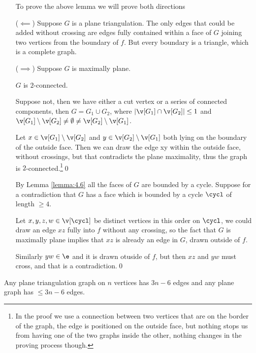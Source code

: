 \begin{prf}
    \begin{itemize}
        To prove the above lemma we will prove both directions
        \item [($\impliedby$)] Suppose $G$ is a plane triangulation. The only edges that could be added without crossing are edges fully contained within a face of $G$ joining two vertices from the boundary of $f$. But every boundary is a triangle, which is a complete graph.
        \item [($\implies$)] Suppose $G$ is maximally plane.
        \begin{customclaim}{1}
        \label{claim:4.8_1}
            $G$ is $2$-connected.
        \end{customclaim}
        \begin{prf}
            Suppose not, then we have either a cut vertex or a series of connected components, then $G = G_1 \cup G_2$, where $|\v[G_1] \cap \v[G_2]| \leq 1$ and $\v[G_1] \setminus \v[G_2] \neq \emptyset \neq \v[G_2] \setminus \v[G_1]$.

            Let $x \in \v[G_1] \setminus \v[G_2]$ and $y \in \v[G_2] \setminus \v[G_1]$ both lying on the boundary of the outside face. Then we can draw the edge xy within the outside face, without crossings, but that contradicts the plane maximality, thus the graph is $2$-connected.\footnote{
                In the proof we use a connection between two vertices that are on the border of the graph, the edge is positioned on the outside face, but nothing stops us from having one of the two graphs inside the other, nothing changes in the proving process though.
            }\qed
        \end{prf}
        By Lemma \ref{lemma:4.6} all the faces of $G$ are bounded by a cycle. Suppose for a contradiction that $G$ has a face which is bounded by a cycle $\cycl$ of length $\geq 4$.

        Let $x, y, z, w \in \v[\cycl]$ be distinct vertices in this order on $\cycl$, we could draw an edge $xz$ fully into $f$ without any crossing, so the fact that $G$ is maximally plane implies that $xz$ is already an edge in $G$, drawn outside of $f$.

        Similarly $yw \in \e$ and it is drawn otuside of $f$, but then $xz$ and $yw$ must cross, and that is a contradiction.\qed
    \end{itemize}
\end{prf}
\begin{customcorollary}{4.9}
\label{corollary:4.9}
    Any plane triangulation graph on $n$ vertices has $3n - 6$ edges and any plane graph has $\leq 3n - 6$ edges.
\end{customcorollary}
